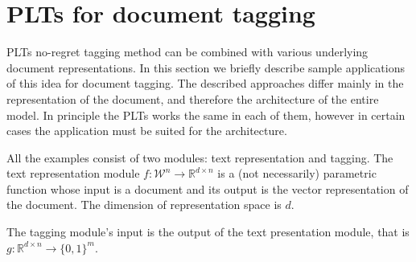 \documentclass{article}
\newcommand{\cD}{\mathcal{D}}
\newcommand{\bd}{\mathbf{d}}
\newcommand{\calW}{\mathcal{W}}
\newcommand\R{\mathbb{R}}   %
\newcommand{\sectionBefore}{-0pt}
\newcommand{\sectionAfter}{-0pt}
\begin{document}
\vspace{\sectionBefore}
\section{PLTs for document tagging}
\label{sec:tagging_PLTs}
\vspace{\sectionAfter}

PLTs no-regret tagging method can be combined with various underlying document representations. In this section we briefly describe sample applications of this idea for document tagging. 
The described approaches differ mainly in the representation of the document, and therefore the architecture of the entire model. In principle the PLTs works the same in each of them, however in certain cases the application must be suited for the architecture.


All the examples consist of two modules: text representation and tagging. The text representation module $f : \calW^{n} \rightarrow \R^{d \times n}$ is a (not necessarily) parametric function whose input is a document and its output is the vector representation of the document. The dimension of representation space is $d$. 

The tagging module's input is the output of the text presentation module, that is $g: \R^{d \times n} \rightarrow  \{ 0 , 1 \}^m$. 

\end{document}
